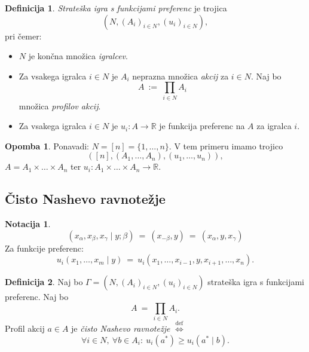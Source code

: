 \documentclass[11pt]{article}
\newcommand{\R}{\mathbb{R}}
\newcommand{\diff}{\overset{\text{def}}{\iff}}
\newcommand{\set}[1]{\{#1\}}
\theoremstyle{definition}
\newtheorem{definicija}{Definicija}[section]
\theoremstyle{definition}
\theoremstyle{definition}
\theoremstyle{definition}
\newtheorem*{opomba}{Opomba}
\newtheorem*{notacija}{Notacija}
\begin{document}
\begin{definicija}

\textit{Strateška igra s funkcijami preferenc} je trojica
$$(N, (A_i)_{i \in N}, (u_i)_{i \in N}),$$
pri čemer:
\begin{itemize}
	\item $N$ je končna množica \textit{igralcev}.
	\item Za vsakega igralca $i \in N$ je $A_i$ neprazna množica \textit{akcij} za $i \in N$. Naj bo 
	$$A ~:=~ \prod_{i \in N} A_i$$
	množica \textit{profilov akcij}.
	\item Za vsakega igralca $i \in N$ je $u_i: A \rightarrow \R$ je funkcija preferenc na $A$ za igralca $i$.
\end{itemize}

\end{definicija}
\vspace{0.5cm}

\begin{opomba}

Ponavadi: $N = [n] = \set{1,\ldots,n}$. V tem primeru imamo trojico
$$([n],(A_1,\ldots,A_n),(u_1,\ldots,u_n)),$$
$A=A_1 \times \ldots \times A_n$ ter $u_i: A_1 \times \ldots \times A_n \rightarrow \R$.

\end{opomba}
\vspace{0.5cm}


\subsection{Čisto Nashevo ravnotežje}
\vspace{0.5cm}

\begin{notacija}

$$(x_\alpha, x_\beta, x_\gamma \mid y; \beta) ~=~ (x_{-\beta}, y) ~=~ (x_\alpha, y, x_\gamma)$$
Za funkcije preferenc:
$$u_i(x_1,\ldots,x_m \mid y) ~=~ u_i(x_1,\ldots,x_{i-1},y,x_{i+1},\ldots,x_n).$$

\end{notacija}
\vspace{0.5cm}

\begin{definicija}

Naj bo $\Gamma = (N, (A_i)_{i \in N}, (u_i)_{i \in N})$ strateška igra s funkcijami preferenc. Naj bo
$$A ~=~ \prod_{i \in N} A_i.$$
Profil akcij $a \in A$ je \textit{čisto Nashevo ravnotežje} $\diff$
$$\forall i \in N, ~\forall b \in A_i: ~u_i(a^*) \geq u_i(a^* \mid b).$$

\end{definicija}
\vspace{0.5cm}


\pagebreak

\end{document}
